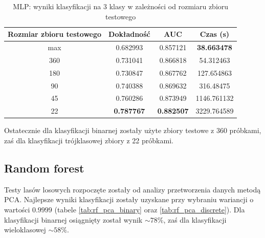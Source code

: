 \documentclass[a4paper, twoside, 11pt, openright]{article}
\begin{document}
\begin{table}[H]
    \centering
    \begin{tabular}{|c|c|c|c|}
    \hline
        \textbf{Rozmiar zbioru testowego} & \textbf{Dokładność} &  \textbf{AUC} &  \textbf{Czas (s)} \\ \hline
max    &  0.682993 &  0.857121 &  \textbf{38.663478} \\ \hline
360     &  0.731041 &  0.866818 &  54.312463 \\ \hline
180   &  0.730847 &  0.867762 &  127.654863 \\ \hline
90   &  0.740388 &  0.869632 &  316.48475 \\ \hline
45     &  0.760286 &  0.873949 &  1146.761132 \\ \hline
22  &  \textbf{0.787767} &  \textbf{0.882507} &  3229.764589 \\ \hline
    \end{tabular}
    \caption{MLP: wyniki klasyfikacji na 3 klasy w zależności od rozmiaru zbioru testowego}
    \label{tab:nn_walk_forward_test_discrete}
\end{table}

Ostatecznie dla klasyfikacji binarnej zostały użyte zbiory testowe z 360 próbkami, zaś dla klasyfikacji trójklasowej zbiory z 22 próbkami.



\subsection{Random forest}

Testy lasów losowych rozpoczęte zostały od analizy przetworzenia danych metodą PCA. Najlepsze wyniki klasyfikacji zostały uzyskane przy wybraniu wariancji o wartości $0.9999$ (tabele \ref{tab:rf_pca_binary} oraz \ref{tab:rf_pca_discrete}). Dla klasyfikacji binarnej osiągnięty został wynik $\sim 78\%$, zaś dla klasyfikacji wieloklasowej  $\sim 58\%$.
\end{document}
